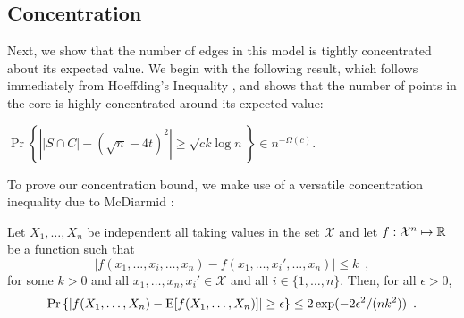 \documentclass{patmorin}
\begin{document}

\subsection{Concentration}

Next, we show that the number of edges in this model is tightly
concentrated about its expected value.  We begin with the following
result, which follows immediately from Hoeffding's Inequality
\cite{boucheron.lugosi.ea:concentration}, and shows that the number of
points in the core is highly concentrated around its expected value:
\begin{lem}
  $\Pr\left\{\left||S\cap C|-(\sqrt{n}-4t)^2\right| \ge \sqrt{ck\log n}\right\}
  \in n^{-\Omega(c)}$.
\end{lem}

To prove our concentration bound, we make use of a versatile concentration
inequality due to McDiarmid \cite[Lemma~1.2]{mcdiarmid:on}:

\begin{lem}
Let $X_1,\ldots,X_n$ be independent all taking values in the set
$\mathcal{X}$ and let $f:\mathcal{X}^n\mapsto\mathbb{R}$ be a function such that
\[
    |f(x_1,\ldots,x_i,\ldots,x_n) - f(x_1,\ldots,x_i',\ldots,x_n)|
    \le k \enspace ,
\]
for some $k>0$ and all $x_1,\ldots,x_n,x_i'\in \mathcal{X}$
and all $i\in\{1,\ldots,n\}$.
Then, for all $\epsilon > 0$,
\[
    \Pr\left\{\left|f(X_1,\ldots,X_n) - \mathrm{E}[f(X_1,\ldots,X_n)]\right| \ge \epsilon\right\}
       \le 2\exp(-2\epsilon^2/(nk^2)) \enspace .
\]
\end{lem}
\end{document}
